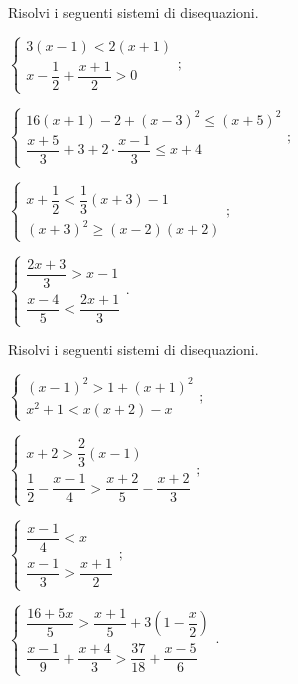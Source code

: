 \begin{esercizio}[\Ast]
 \label{ese:20.41}
 Risolvi i seguenti sistemi di disequazioni.
 \begin{multicols}{2}
 \begin{enumeratea}
 \item $\left\{\begin{array}{l}
	3(x-1)<2(x+1)\\
	x-\dfrac{1}{2}+\dfrac{x+1}{2}>0
	\end{array}\right.;$
\item {\longarray $\left\{\begin{array}{l}
	16(x+1)-2+(x-3)^{2}\le(x+5)^{2}\\
	\dfrac{x+5}{3}+3+2\cdot\dfrac{x-1}{3}\le x+4
	\end{array}\right.;$}
\item {\longarray $\left\{\begin{array}{l}
	x+\dfrac{1}{2}<\dfrac{1}{3}(x+3)-1\\
	(x+3)^{2}\ge (x-2)(x+2)
	\end{array}\right.;$}
\item {\longarray $\left\{\begin{array}{l}
	\dfrac{2x+3}{3}>x-1\\
	\dfrac{x-4}{5}<\dfrac{2x+1}{3}
	\end{array}\right..$}
\end{enumeratea}
\end{multicols}
\end{esercizio}

\begin{esercizio}[\Ast]
 \label{ese:20.42}
 Risolvi i seguenti sistemi di disequazioni.
 \begin{multicols}{2}
 \begin{enumeratea}
 \item $\left\{\begin{array}{l}
	(x-1)^{2}>1+(x+1)^{2}\\
	x^{2}+1<x(x+2)-x
	\end{array}\right.;$
\item {\longarray $\left\{\begin{array}{l}
	x+2>\dfrac{2}{3}(x-1)\\
	\dfrac{1}{2}-\dfrac{x-1}{4}>\dfrac{x+2}{5}-\dfrac{x+2}{3}
	\end{array}\right.;$}
\item {\longarray $\left\{\begin{array}{l}
	\dfrac{x-1}{4}<x\\
	\dfrac{x-1}{3}>\dfrac{x+1}{2}
	\end{array}\right.;$}
\item {\longarray $\left\{\begin{array}{l}
	\dfrac{16+5x}{5}>\dfrac{x+1}{5}+3\left(1-\dfrac{x}{2}\right)\\
	\dfrac{x-1}{9}+\dfrac{x+4}{3}>\dfrac{37}{18}+\dfrac{x-5}{6}
	\end{array}\right..$}
\end{enumeratea}
\end{multicols}
\end{esercizio}

